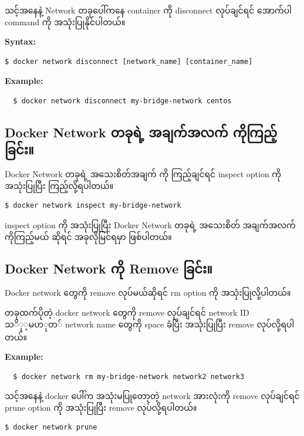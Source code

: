 \documentclass{article}
\begin{document}
သင့်အနေနဲ့ Network တခုပေါ်ကနေ container ကို disconnect လုပ်ချင်ရင်
အောက်ပါ command ကို အသုံးပြုနိုင်ပါတယ်။

\textbf{Syntax:}

\begin{verbatim}
$ docker network disconnect [network_name] [container_name]
\end{verbatim}

\textbf{Example:}

\begin{verbatim}
  $ docker network disconnect my-bridge-network centos
\end{verbatim}

\subsection{Docker Network တခုရဲ့ အချက်အလက်
ကိုကြည့်ခြင်း။}\label{docker-network---}

Docker Network တခုရဲ့ အသေးစိတ်အချက် ကို ကြည့်ချင်ရင် inspect option ကို
အသုံးပြုပြီး ကြည့်လို့ရပါတယ်။

\begin{verbatim}
$ docker network inspect my-bridge-network
\end{verbatim}

inspect option ကို အသုံးပြုပြီး Docker Network တခုရဲ့ အသေးစိတ်
အချက်အလက်ကိုကြည့်မယ် ဆိုရင် အခုလိုမြင်ရမှာ ဖြစ်ပါတယ်။

\subsection{Docker Network ကို Remove
ခြင်း။}\label{docker-network--remove-}

Docker network တွေကို remove လုပ်မယ်ဆိုရင် rm option ကို
အသုံးပြုလို့ပါတယ်။

တခုထက်ပိုတဲ့ docker network တွေကို remove လုပ်ချင်ရင် network ID
$သို့မဟုတ်$ network name တွေကို space ခံပြီး အသုံးပြုပြီး remove
လုပ်လို့ရပါတယ်။

\textbf{Example:}

\begin{verbatim}
  $ docker network rm my-bridge-network network2 network3
\end{verbatim}

သင့်အနေနဲ့ docker ပေါ်က အသုံးမပြုတော့တဲ့ network အားလုံးကို remove
လုပ်ချင်ရင် prune option ကို အသုံးပြုပြီး remove လုပ်လို့ရပါတယ်။

\begin{verbatim}
$ docker network prune
\end{verbatim}
\end{document}
